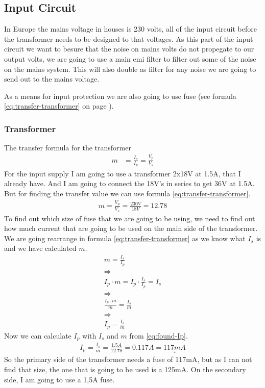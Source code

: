 \subsection{Input Circuit}
In Europe the mains voltage in houses is 230 volts, all of the input circuit before the transformer needs to be designed to that voltages. 
As this part of the input circuit we want to besure that the noise on mains volts do not propegate to our output volts, 
we are going to use a main emi filter to filter out some of the noise on the mains system. 
This will also double as filter for any noise we are going to send out to the mains voltage. 

As a means for input protection we are also going to use fuse (see formula \ref{eq:transfer-transformer} on page \pageref{eq:transfer-transformer}).

\subsubsection{Transformer}
The transfer formula for the transformer 
\begin{align}\label{eq:transfer-transformer}
m &= \frac{I_s}{I_p} = \frac{V_p}{V_s}
\end{align}
For the input supply I am going to use a transformer 2x18V at 1.5A, that I already have. And I am going to connect the 18V's in series to get 36V at 1.5A. But for finding the transfer value we can use formula \ref{eq:transfer-transformer}.
\begin{align}   
m = \frac{V_p}{V_s} = \frac{230V}{18V} = 12.78 \nonumber
\end{align}
 To find out which size of fuse that we are going to be using, we need to find out how much current that are going to be used on the main side of the transformer.
We are going rearrange in formula \ref{eq:transfer-transformer} as we know what $I_s$ is and we have calculated $m$.
\begin{align}
m = \frac{I_s}{I_p} \nonumber \\
\Rightarrow \nonumber \\
I_p \cdot m = I_p \cdot \frac{I_s}{I_p} = I_s \nonumber \\
\Rightarrow \nonumber \\
\frac{ I_p \cdot m}{m} = \frac{I_s}{m} \nonumber \\
\Rightarrow \nonumber \\
I_p = \frac{I_s}{m} \label{eq:found-Ip}
\end{align}
Now we can calculate $I_p$ with $I_s$ and $m$ from \ref{eq:found-Ip}.
\begin{align}
I_p = \frac{I_s}{m} = \frac{1.5A}{12.78} = 0.117A = \underline{\underline{117mA}} \nonumber 
\end{align}
So the primary side of the transformer needs a fuse of 117mA, 
but as I can not find that size, the one that is going to be used is a 125mA.
On the secondary side, I am going to use a 1,5A fuse.

